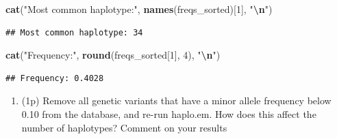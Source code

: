 \documentclass[
]{article}
\newenvironment{Shaded}{\begin{snugshade}}{\end{snugshade}}
\newcommand{\AttributeTok}[1]{\textcolor[rgb]{0.13,0.29,0.53}{#1}}
\newcommand{\ControlFlowTok}[1]{\textcolor[rgb]{0.13,0.29,0.53}{\textbf{#1}}}
\newcommand{\DecValTok}[1]{\textcolor[rgb]{0.00,0.00,0.81}{#1}}
\newcommand{\FunctionTok}[1]{\textcolor[rgb]{0.13,0.29,0.53}{\textbf{#1}}}
\newcommand{\NormalTok}[1]{#1}
\newcommand{\OtherTok}[1]{\textcolor[rgb]{0.56,0.35,0.01}{#1}}
\newcommand{\SpecialCharTok}[1]{\textcolor[rgb]{0.81,0.36,0.00}{\textbf{#1}}}
\newcommand{\StringTok}[1]{\textcolor[rgb]{0.31,0.60,0.02}{#1}}
\providecommand{\tightlist}{%
  \setlength{\itemsep}{0pt}\setlength{\parskip}{0pt}}
\begin{document}
\begin{Shaded}
\begin{Highlighting}[]
\FunctionTok{cat}\NormalTok{(}\StringTok{"Most common haplotype:"}\NormalTok{, }\FunctionTok{names}\NormalTok{(freqs\_sorted)[}\DecValTok{1}\NormalTok{], }\StringTok{"}\SpecialCharTok{\textbackslash{}n}\StringTok{"}\NormalTok{)}
\end{Highlighting}
\end{Shaded}

\begin{verbatim}
## Most common haplotype: 34
\end{verbatim}

\begin{Shaded}
\begin{Highlighting}[]
\FunctionTok{cat}\NormalTok{(}\StringTok{"Frequency:"}\NormalTok{, }\FunctionTok{round}\NormalTok{(freqs\_sorted[}\DecValTok{1}\NormalTok{], }\DecValTok{4}\NormalTok{), }\StringTok{"}\SpecialCharTok{\textbackslash{}n}\StringTok{"}\NormalTok{)}
\end{Highlighting}
\end{Shaded}

\begin{verbatim}
## Frequency: 0.4028
\end{verbatim}

\begin{enumerate}
\def\labelenumi{\arabic{enumi}.}
\setcounter{enumi}{3}
\tightlist
\item
  (1p) Remove all genetic variants that have a minor allele frequency
  below 0.10 from the database, and re-run haplo.em. How does this
  affect the number of haplotypes? Comment on your results
\end{enumerate}

\begin{Shaded}
\end{Shaded}
\end{document}
